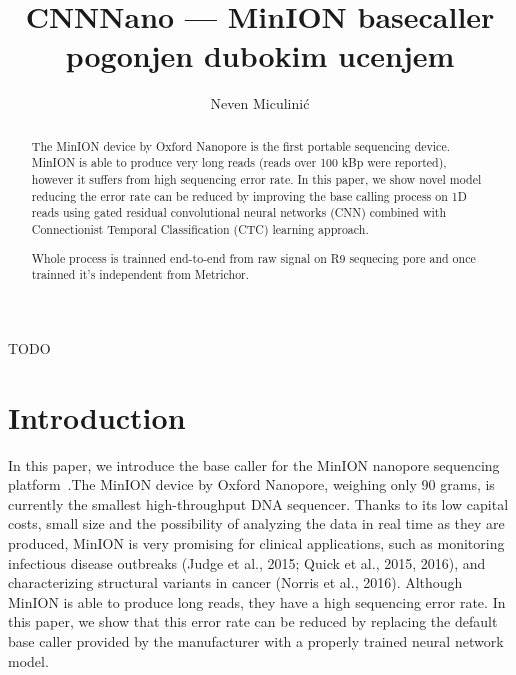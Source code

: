 \documentclass[times, utf8, seminar]{fer}
\begin{document}
\theoremstyle{definition}
\newtheorem{definition}{Definition}[section]

\title{CNNNano --- MinION  basecaller pogonjen dubokim ucenjem}
\author{Neven Miculinić}

\maketitle
\tableofcontents

\begin{sazetak}
TODO


\end{sazetak}

\begin{abstract}
    The MinION device by Oxford Nanopore is the first portable sequencing device. MinION is able to produce very long reads (reads over 100 kBp were reported), however it suffers from high sequencing error rate. In this paper, we show novel model reducing the error rate can be reduced by improving the base calling process on 1D reads using gated residual convolutional neural networks (CNN) combined with Connectionist Temporal Classification (CTC) learning approach.

    Whole process is trainned end-to-end from raw signal on R9 sequecing pore and once trainned it's independent from Metrichor.
\keywords{}
\end{abstract}

\chapter{Introduction}

In this paper, we introduce the base caller for the MinION nanopore sequencing platform~\cite{mikheyev2014first}.The MinION device by Oxford Nanopore, weighing only 90 grams, is currently the smallest high-throughput DNA sequencer. Thanks to its low capital costs, small size and the possibility of analyzing the data in real time as they are produced, MinION is very promising for clinical applications, such as monitoring infectious disease outbreaks (Judge et al., 2015; Quick et al., 2015, 2016), and characterizing structural variants in cancer (Norris et al., 2016). Although MinION is able to produce long reads, they have a high sequencing error rate. In this paper, we show that this error rate can be reduced by replacing the default base caller provided by the manufacturer with a properly trained neural network model.
\end{document}
